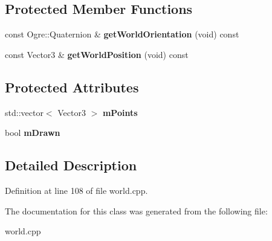 \subsection*{Protected Member Functions}
\begin{DoxyCompactItemize}
\item 
\hypertarget{classphys_1_1debug_1_1Line3D_a918d57f174432e6cbf4b31282b2140da}{
const Ogre::Quaternion \& {\bfseries getWorldOrientation} (void) const }
\label{d6/d1b/classphys_1_1debug_1_1Line3D_a918d57f174432e6cbf4b31282b2140da}

\item 
\hypertarget{classphys_1_1debug_1_1Line3D_a2cf807b1c4d3770889ba8e5114619d4b}{
const Vector3 \& {\bfseries getWorldPosition} (void) const }
\label{d6/d1b/classphys_1_1debug_1_1Line3D_a2cf807b1c4d3770889ba8e5114619d4b}

\end{DoxyCompactItemize}
\subsection*{Protected Attributes}
\begin{DoxyCompactItemize}
\item 
\hypertarget{classphys_1_1debug_1_1Line3D_ad82efc7c9d8cd1ca573c956705316807}{
std::vector$<$ Vector3 $>$ {\bfseries mPoints}}
\label{d6/d1b/classphys_1_1debug_1_1Line3D_ad82efc7c9d8cd1ca573c956705316807}

\item 
\hypertarget{classphys_1_1debug_1_1Line3D_a70e1784bd640ae3a3b9b755a40bc9185}{
bool {\bfseries mDrawn}}
\label{d6/d1b/classphys_1_1debug_1_1Line3D_a70e1784bd640ae3a3b9b755a40bc9185}

\end{DoxyCompactItemize}


\subsection{Detailed Description}


Definition at line 108 of file world.cpp.



The documentation for this class was generated from the following file:\begin{DoxyCompactItemize}
\item 
world.cpp\end{DoxyCompactItemize}
